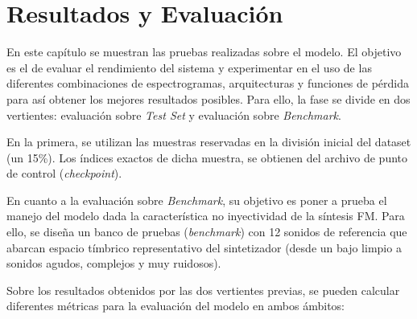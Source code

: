 \chapter{Resultados y Evaluación}
\label{cap:ResultadosYEvaluacion}

En este capítulo se muestran las pruebas realizadas sobre el modelo. El objetivo es el de evaluar el rendimiento del sistema y experimentar en el uso de las
diferentes combinaciones de espectrogramas, arquitecturas y funciones de pérdida para así obtener los mejores resultados posibles. Para ello, la fase se divide en dos vertientes:
evaluación sobre \textit{Test Set} y evaluación sobre \textit{Benchmark}. 

En la primera, se utilizan las muestras reservadas en la división inicial del dataset (un 15\%).
Los índices exactos de dicha muestra, se obtienen del archivo de punto de control (\textit{checkpoint}). 

En cuanto a la evaluación sobre \textit{Benchmark}, su objetivo 
es poner a prueba el manejo del modelo dada la característica no inyectividad de la síntesis FM. Para
ello, se diseña un banco de pruebas (\textit{benchmark}) con 12 sonidos de referencia que abarcan espacio tímbrico representativo
del sintetizador (desde un bajo limpio a sonidos agudos, complejos y muy ruidosos).

Sobre los resultados obtenidos por las dos vertientes previas, se pueden calcular diferentes métricas
para la evaluación del modelo en ambos ámbitos:

